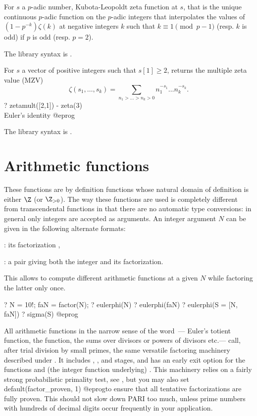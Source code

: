 For $s$ a $p$-adic number, Kubota-Leopoldt zeta function at $s$, that
is the unique continuous $p$-adic function on the $p$-adic integers
that interpolates the values of $(1 - p^{-k}) \zeta(k)$ at negative
integers $k$ such that $k \equiv 1 \pmod{p-1}$ (resp. $k$ is odd) if
$p$ is odd (resp. $p = 2$).

The library syntax is .

\label{se:zetamult}
For $s$ a vector of positive integers such that $s[1] \geq 2$,
returns the multiple zeta value (MZV)
$$\zeta(s_1,\dots, s_k) = \sum_{n_1>\dots>n_k>0} n_1^{-s_1}\dots n_k^{-s_k}.$$
\bprog
? zetamult([2,1]) - zeta(3) \\ Euler's identity
@eprog

The library syntax is .

\section{Arithmetic functions}\label{se:arithmetic}

These functions are by definition functions whose natural domain of
definition is either $\Z$ (or $\Z_{>0}$). The way these functions are used is
completely different from transcendental functions in that there are no
automatic type conversions: in general only integers are accepted as
arguments. An integer argument $N$ can be given in the following alternate
formats:

\item {}: its factorization ,

\item {}: a pair \kbd{[$N$, fa]} giving both the integer and
  its factorization.

This allows to compute different arithmetic functions at a given $N$
while factoring the latter only once.

\bprog
  ? N = 10!; faN = factor(N);
  ? eulerphi(N)
  ? eulerphi(faN)
  ? eulerphi(S = [N, faN])
  ? sigma(S)
@eprog

All arithmetic functions in the narrow sense of the word~--- Euler's
totient function, the  function,
the sums over divisors or powers of divisors etc.--- call, after trial
division by small primes, the same versatile factoring machinery described
under . It includes , ,
 and  stages, and has an early exit option for the
functions  and (the integer function underlying)
. This machinery relies on a fairly strong
probabilistic primality test, see , but you may also set
\bprog
  default(factor_proven, 1)
@eprog\noindent to ensure that all tentative factorizations are fully proven.
This should not slow down PARI too much, unless prime numbers with
hundreds of decimal digits occur frequently in your application.

